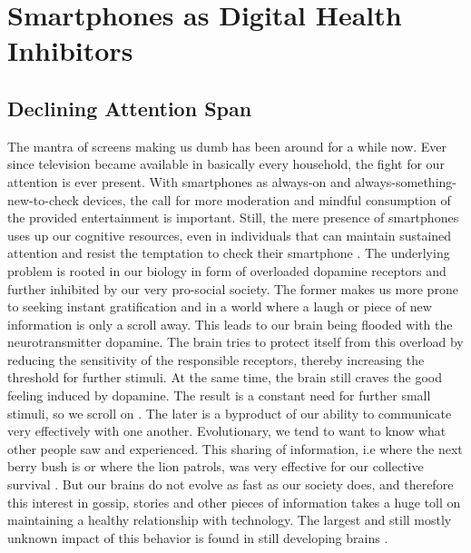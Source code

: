 \section{Smartphones as Digital Health Inhibitors}
\subsection{Declining Attention Span}
The mantra of screens making us dumb has been around for a while now. Ever since television became available in basically every household, the fight for our attention is ever present. With smartphones as always-on and always-something-new-to-check devices, the call for more moderation and mindful consumption of the provided entertainment is important. Still, the mere presence of smartphones uses up our cognitive resources, even in individuals that can maintain sustained attention and resist the temptation to check their smartphone \cite{ward2017brain}. The underlying problem is rooted in our biology in form of overloaded dopamine receptors and further inhibited by our very pro-social society. The former makes us more prone to seeking instant gratification and in a world where a laugh or piece of new information is only a scroll away. This leads to our brain being flooded with the neurotransmitter dopamine. The brain tries to protect itself from this overload by reducing the sensitivity of the responsible receptors, thereby increasing the threshold for further stimuli. At the same time, the brain still craves the good feeling induced by dopamine. The result is a constant need for further small stimuli, so we scroll on \cite{nieoullon2002dopamine,dopamineRole}. The later is a byproduct of our ability to communicate very effectively with one another. Evolutionary, we tend to want to know what other people saw and experienced. This sharing of information, i.e where the next berry bush is or where the lion patrols, was very effective for our collective survival \cite{sapiens}. But our brains do not evolve as fast as our society does, and therefore this interest in gossip, stories and other pieces of information takes a huge toll on maintaining a healthy relationship with technology. The largest and still mostly unknown impact of this behavior is found in still developing brains \cite{crone2018media}.
